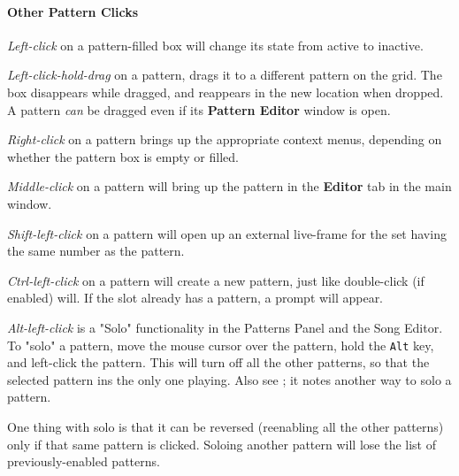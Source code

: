 \paragraph{Other Pattern Clicks}
\label{paragraph:patterns_pattern_clicks}

   \textsl{Left-click} on a pattern-filled box will change its state
   from active to inactive.

   \textsl{Left-click-hold-drag} on a pattern, drags it to a different
   pattern on the grid.
   The box disappears while dragged, and reappears in the new location when
   dropped.  A pattern \textsl{can} be dragged even if its
   \textbf{Pattern Editor} window is open.

   \textsl{Right-click} on a pattern brings up the appropriate context menus,
   depending on whether the pattern box is empty or filled.

   \textsl{Middle-click} on a pattern will bring up the pattern
   in the \textbf{Editor}
   tab in the main window.

   \textsl{Shift-left-click} on a pattern will open up an external
   live-frame for the
   set having the same number as the pattern.

   \textsl{Ctrl-left-click} on a pattern will create a new pattern, just like
   double-click (if enabled) will.
   If the slot already has a pattern, a prompt will appear.

   \textsl{Alt-left-click}
   is a "Solo" functionality in the Patterns
   Panel and the Song Editor.  To "solo" a pattern, move the mouse cursor
   over the pattern, hold the \texttt{Alt} key, and left-click the pattern.
   This will turn off all the other patterns, so that the selected pattern ins
   the only one playing.
   Also see ; it notes another way to
   solo a pattern.

   One thing with solo is that it can be reversed (reenabling all
   the other patterns) only if that same pattern is clicked.
   Soloing another
   pattern will lose the list of previously-enabled patterns.

